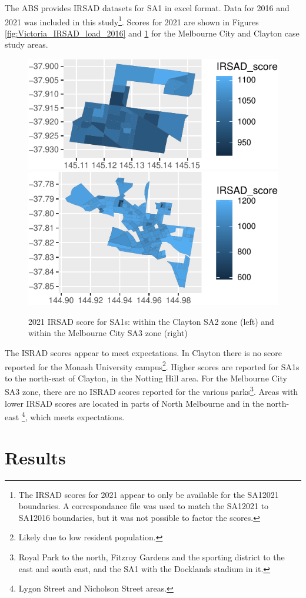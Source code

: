 \documentclass[]{tufte-book}
\begin{document}
The ABS provides IRSAD datasets for SA1 in excel format. Data for 2016
and 2021 was included in this study\footnote{The IRSAD scores for 2021
  appear to only be available for the SA12021 boundaries. A
  correspondance file was used to match the SA12021 to SA12016
  boundaries, but it was not possible to factor the scores.}. Scores for
2021 are shown in Figures \ref{fig:Victoria_IRSAD_load_2016} and
\ref{fig:Victoria_IRSAD_load_2021} for the Melbourne City and Clayton
case study areas.

\begin{figure}
\includegraphics[width=0.5\linewidth]{Reynolds_Currie_2024_transit_supply_index_GTFS_files/figure-latex/Victoria_IRSAD_load_2021-1} \includegraphics[width=0.5\linewidth]{Reynolds_Currie_2024_transit_supply_index_GTFS_files/figure-latex/Victoria_IRSAD_load_2021-2} \caption[2021 IRSAD score for SA1s]{2021 IRSAD score for SA1s: within the Clayton SA2 zone (left) and within the Melbourne City SA3 zone (right)}\label{fig:Victoria_IRSAD_load_2021}
\end{figure}

The ISRAD scores appear to meet expectations. In Clayton there is no
score reported for the Monash University campus\footnote{Likely due to
  low resident population.}. Higher scores are reported for SA1s to the
north-east of Clayton, in the Notting Hill area. For the Melbourne City
SA3 zone, there are no ISRAD scores reported for the various
parks\footnote{Royal Park to the north, Fitzroy Gardens and the sporting
  district to the east and south east, and the SA1 with the Docklands
  stadium in it.}. Areas with lower IRSAD scores are located in parts of
North Melbourne and in the north-east \footnote{Lygon Street and
  Nicholson Street areas.}, which meets expectations.

\hypertarget{results}{%
\chapter{Results}\label{results}}
\end{document}
